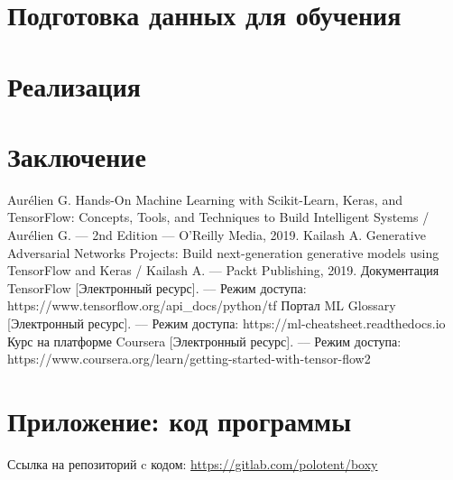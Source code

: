 \documentclass[12pt]{article}
\begin{document}
\section*{Подготовка данных для обучения}

\section*{Реализация}

\section*{Заключение}

\begin{thebibliography}{3}
Aurélien G. Hands-On Machine Learning with Scikit-Learn, Keras, and TensorFlow: Concepts, Tools, and Techniques to Build Intelligent Systems / Aurélien G. --- 2nd Edition --- O'Reilly Media, 2019.
Kailash A. Generative Adversarial Networks Projects: Build next-generation generative models using TensorFlow and Keras / Kailash A. ---  Packt Publishing, 2019.
Документация TensorFlow [Электронный ресурс]. –-- Режим доступа: https://www.tensorflow.org/api\_docs/python/tf
Портал ML Glossary [Электронный ресурс]. –-- Режим доступа: https://ml-cheatsheet.readthedocs.io
Курс на платформе Coursera [Электронный ресурс]. –-- Режим доступа: https://www.coursera.org/learn/getting-started-with-tensor-flow2
\end{thebibliography}

\section*{Приложение: код программы}
Ссылка на репозиторий c кодом: \url{https://gitlab.com/polotent/boxy}
\restoregeometry
\end{document}
